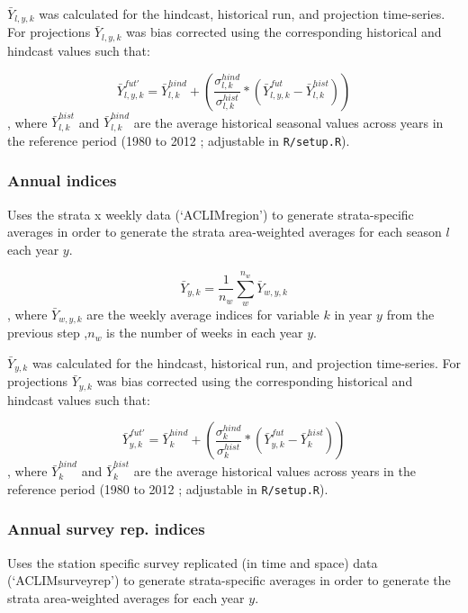 \documentclass[
]{article}
\begin{document}
\(\bar{Y}_{l,y,k}\) was calculated for the hindcast, historical run, and
projection time-series. For projections \(\bar{Y}_{l,y,k}\) was bias
corrected using the corresponding historical and hindcast values such
that:

\[\bar{Y}^{fut'}_{l,y,k} =\bar{Y}^{hind}_{l,k} +\left( \frac{\sigma^{hind}_{l,k}}{\sigma^{hist}_{l,k}}*(\bar{Y}^{fut}_{l,y,k}-\bar{Y}^{hist}_{l,k})  \right )\],
where \(\bar{Y}^{hist}_{l,k}\) and \(\bar{Y}^{hind}_{l,k}\) are the
average historical seasonal values across years in the reference period
(1980 to 2012 ; adjustable in \texttt{R/setup.R}).

\hypertarget{annual-indices}{%
\subsubsection{Annual indices}\label{annual-indices}}

Uses the strata x weekly data (`ACLIMregion') to generate
strata-specific averages in order to generate the strata area-weighted
averages for each season \(l\) each year \(y\).

\[\bar{Y}_{y,k}= \frac{1}{n_w}\sum^{n_w}_{w}\bar{Y}_{w,y,k}\], where
\(\bar{Y}_{w,y,k}\) are the weekly average indices for variable \(k\) in
year \(y\) from the previous step ,\(n_w\) is the number of weeks in
each year \(y\).

\(\bar{Y}_{y,k}\) was calculated for the hindcast, historical run, and
projection time-series. For projections \(\bar{Y}_{y,k}\) was bias
corrected using the corresponding historical and hindcast values such
that:

\[\bar{Y}^{fut'}_{y,k} =\bar{Y}^{hind}_{k} +\left( \frac{\sigma^{hind}_{k}}{\sigma^{hist}_{k}}*(\bar{Y}^{fut}_{y,k}-\bar{Y}^{hist}_{k})  \right )\],
where \(\bar{Y}^{hind}_{k}\) and \(\bar{Y}^{hist}_{k}\) are the average
historical values across years in the reference period (1980 to 2012 ;
adjustable in \texttt{R/setup.R}).

\hypertarget{annual-survey-rep.-indices}{%
\subsubsection{Annual survey rep.
indices}\label{annual-survey-rep.-indices}}

Uses the station specific survey replicated (in time and space) data
(`ACLIMsurveyrep') to generate strata-specific averages in order to
generate the strata area-weighted averages for each year \(y\).
\end{document}
